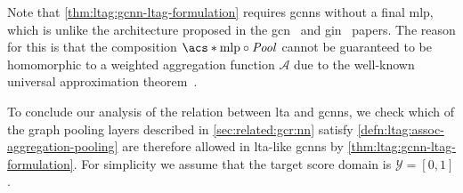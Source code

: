 Note that \cref{thm:ltag:gcnn-ltag-formulation} requires \acp{gcnn} without a final \ac{mlp}, which is unlike the architecture proposed in the \ac{gcn}~\cite{Kipf2017} and \ac{gin}~\cite{Xu2018} papers.
The reason for this is that the composition $\mathrm{\acs*{mlp}} \circ \mathit{Pool}$ cannot be guaranteed to be homomorphic to a weighted aggregation function $\mathcal{A}$ due to the well-known universal approximation theorem~\cite{Hornik1991}.

To conclude our analysis of the relation between \ac{lta} and \acp{gcnn}, we check which of the graph pooling layers described in \cref{sec:related:gcr:nn} satisfy \cref{defn:ltag:assoc-aggregation-pooling} are therefore allowed in \acs{lta}-like \acp{gcnn} by \cref{thm:ltag:gcnn-ltag-formulation}.
For simplicity we assume that the target score domain is $\mathcal{Y} = [0, 1]$.
